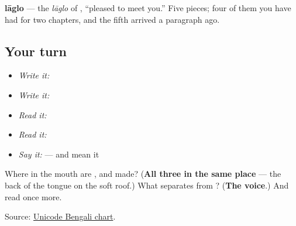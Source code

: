 \textbf{lāglo} — the \emph{lāglo} of \textbf{   }, \textquotedblleft{}pleased to meet you.\textquotedblright{} Five pieces; four of them you have had for two chapters, and the fifth arrived a paragraph ago.

\subsection*{Your turn}
\begin{itemize}
\raggedright
  \item \emph{Write it:} 
  \item \emph{Write it:}   
  \item \emph{Read it:} 
  \item \emph{Read it:} 
  \item \emph{Say it:} \textbf{ } — and mean it
\end{itemize}

\begin{tcolorbox}[breakable,colback=teal!4,colframe=teal!35!black,title={Before you move on}]
Where in the mouth are \textbf{}, \textbf{} and \textbf{} made? (\textbf{All three in the same place} — the back of the tongue on the soft roof.) What separates \textbf{} from \textbf{}? (\textbf{The voice}.) And read \textbf{} once more.

Source: \href{https://www.unicode.org/charts/PDF/U0980.pdf}{Unicode Bengali chart}.
\end{tcolorbox}
